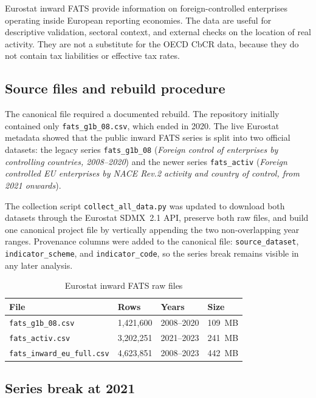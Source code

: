 \documentclass[11pt,a4paper]{article}
\begin{document}
Eurostat inward FATS provide information on foreign-controlled enterprises
operating inside European reporting economies.  The data are useful for
descriptive validation, sectoral context, and external checks on the location
of real activity.  They are not a substitute for the OECD CbCR data, because
they do not contain tax liabilities or effective tax rates.

\subsection{Source files and rebuild procedure}

The canonical file required a documented rebuild.  The repository initially
contained only \texttt{fats\_g1b\_08.csv}, which ended in 2020.  The live
Eurostat metadata showed that the public inward FATS series is split into two
official datasets: the legacy series \texttt{fats\_g1b\_08}
(\emph{Foreign control of enterprises by controlling countries, 2008--2020})
and the newer series \texttt{fats\_activ}
(\emph{Foreign controlled EU enterprises by NACE Rev.2 activity and country of
control, from 2021 onwards}).

The collection script \texttt{collect\_all\_data.py} was updated to download
both datasets through the Eurostat SDMX~2.1 API, preserve both raw files, and
build one canonical project file by vertically appending the two
non-overlapping year ranges.  Provenance columns were added to the canonical
file: \texttt{source\_dataset}, \texttt{indicator\_scheme}, and
\texttt{indicator\_code}, so the series break remains visible in any later
analysis.

\begin{table}[H]
\centering
\caption{Eurostat inward FATS raw files}\label{tab:fats_files}
\begin{tabular}{@{}L{5.5cm} C{1.8cm} C{2.0cm} C{2.0cm}@{}}
\toprule
\textbf{File} & \textbf{Rows} & \textbf{Years} & \textbf{Size} \\
\midrule
\texttt{fats\_g1b\_08.csv}          & 1{,}421{,}600 & 2008--2020 & 109~MB \\
\texttt{fats\_activ.csv}            & 3{,}202{,}251 & 2021--2023 & 241~MB \\
\texttt{fats\_inward\_eu\_full.csv} & 4{,}623{,}851 & 2008--2023 & 442~MB \\
\bottomrule
\end{tabular}
\end{table}

\subsection{Series break at 2021}
\end{document}
